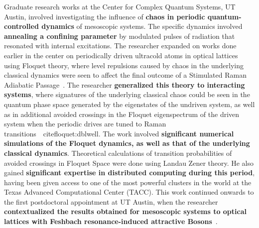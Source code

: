 \documentclass[a4paper,11pt,color]{article}
\begin{document}
Graduate research works at the Center for Complex Quantum Systems, UT Austin, involved investigating the influence of \textbf{chaos in periodic quantum-controlled dynamics} of mesoscopic systems. The specific dynamics involved \textbf{annealing a confining parameter} by modulated pulses of radiation that resonated with internal excitations. The researcher expanded on works done earlier in the center on periodically driven ultracold atoms in optical lattices using Floquet theory, where level repulsions caused by chaos in the underlying classical dynamics were seen to affect the final outcome of a Stimulated Raman Adiabatic Passage~\cite{stirap}. The researcher \textbf{generalized this theory to interacting systems}, where signatures of the underlying classical chaos could be seen in the quantum phase space generated by the eigenstates of the undriven system, as well as in additional avoided crossings in the Floquet eigenspectrum of the driven system when the periodic drives are tuned to Raman transitions~\
cite{floquet:dblwell}. The work involved \textbf{significant numerical simulations of the Floquet dynamics, as well as that of the underlying classical dynamics}. Theoretical calculations of transition probabilities of avoided crossings in Floquet Space were done using Landau Zener theory. He also gained \textbf{significant expertise in distributed computing during this period}, having been given access to one of the most powerful clusters in the world at the Texas Advanced Computational Center (TACC). This work continued onwards to the first postdoctoral appointment at UT Austin, when the researcher \textbf{contextualized the results obtained for mesoscopic systems to optical lattices with Feshbach resonance-induced attractive Bosons}~\cite{floquet:oplattice}. 
\end{document}
